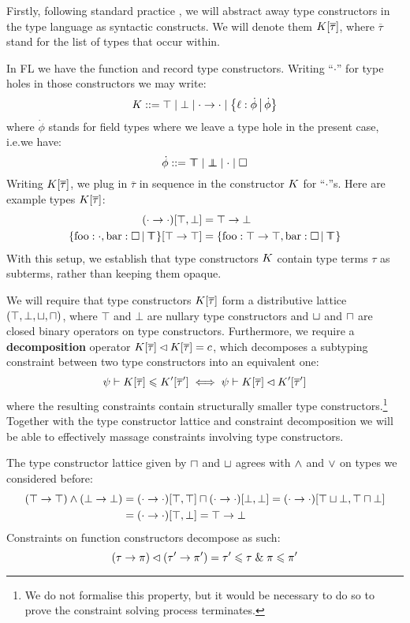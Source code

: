 Firstly, following standard practice \cite{essence-of-ml-type-inference, constraint-based-freeze-ml},  we will abstract away type constructors in the type language as syntactic constructs. We will denote them $K[\overline \tau]$, where $\overline \tau$ stand for the list of types that occur within.
\begin{example}
    In FL we have the function and record type constructors. Writing \enquote{$\cdot$} for type holes in those constructors we may write:
    $$ \constr ::= \top \mid \bot \mid {\cdot} \to {\cdot} \mid \flext{\ell : \dot \phi}{\dot \phi} $$
    where $\dot \phi$ stands for field types where we leave a type hole in the present case, i.e.\@ we have:
    $$ \dot \phi ::= \flftop \mid \flfbot \mid \cdot \mid \flabsent $$
    Writing $K[\overline \tau]$, we plug in $\overline \tau$ in sequence in the constructor $K$ for \enquote{$\cdot$}s. Here are example types $K[\overline \tau]$:
    \begin{align*}  
        (\cdot \to \cdot)[\top, \bot] &= \top \to \bot \\
        \flext{\mathrm{foo}: \cdot, \mathrm{bar} : \flabsent}{\flftop}[\top \to \top] &= \flext{\mathrm{foo}: \top \to \top, \mathrm{bar} : \flabsent}{\flftop}
    \end{align*}
    With this setup, we establish that type constructors $K$ contain type terms $\tau$ as subterms, rather than keeping them opaque. 
\end{example}
We will require that type constructors $K[\overline \tau]$ form a distributive lattice $(\top, \bot, \sqcup, \sqcap)$, where $\top$ and $\bot$ are nullary type constructors and $\sqcup$ and $\sqcap$ are closed binary operators on type constructors. Furthermore, we require a \textbf{decomposition} operator $K[\overline \tau] \lhd K[\overline \tau] = c$, which decomposes a subtyping constraint between two type constructors into an equivalent one:
$$ \psi \vdash K[\overline \tau] \leqslant K'[\overline \tau'] \iff \psi \vdash K[\overline \tau] \lhd K'[\overline \tau'] $$
where the resulting constraints contain structurally smaller type constructors.\footnote{We do not formalise this property, but it would be necessary to do so to prove the constraint solving process terminates.} Together with the type constructor lattice and constraint decomposition we will be able to effectively massage constraints involving type constructors. 
\begin{example}
    The type constructor lattice given by $\sqcap$ and $\sqcup$ agrees with $\land$ and $\lor$ on types we considered before:
    \begin{align*}
       (\top \to \top) \land (\bot \to \bot) 
       &= (\cdot \to \cdot)[\top, \top] \sqcap (\cdot \to \cdot)[\bot, \bot] = (\cdot \to \cdot)[\top \sqcup \bot, \top \sqcap \bot] \\
       &= (\cdot \to \cdot)[\top, \bot] = \top \to \bot 
    \end{align*}
    Constraints on function constructors decompose as such:
    $$ (\tau \to \pi) \lhd (\tau' \to \pi') = \tau' \leqslant \tau \;\&\; \pi \leqslant \pi' $$
\end{example}

